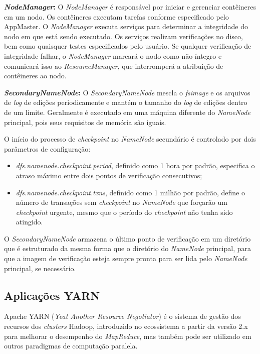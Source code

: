 \textbf{\emph{NodeManager}:} O \emph{NodeManager} é responsável por iniciar e gerenciar contêineres em um nodo. Os contêineres executam tarefas conforme especificado pelo AppMaster. O \emph{NodeManager} executa serviços para determinar a integridade do nodo em que está sendo executado. Os serviços realizam verificações no disco, bem como quaisquer testes especificados pelo usuário. Se qualquer verificação de integridade falhar, o \emph{NodeManager} marcará o nodo como não íntegro e comunicará isso ao \emph{ResourceManager}, que interromperá a atribuição de contêineres ao nodo.


    
\textbf{\emph{SecondaryNameNode}:} O \emph{SecondaryNameNode} mescla o \emph{fsimage} e os arquivos de \emph{log} de edições periodicamente e mantém o tamanho do \emph{log} de edições dentro de um limite. Geralmente é executado em uma máquina diferente do \emph{NameNode} principal, pois seus requisitos de memória são iguais.

O início do processo de \emph{checkpoint} no \emph{NameNode} secundário é controlado por dois parâmetros de configuração:

\begin{itemize}

\item \emph{dfs.namenode.checkpoint.period}, definido como 1 hora por padrão, especifica o atraso máximo entre dois pontos de verificação consecutivos;

\item \emph{dfs.namenode.checkpoint.txns}, definido como 1 milhão por padrão, define o número de transações sem \emph{checkpoint} no \emph{NameNode} que forçarão um \emph{checkpoint} urgente, mesmo que o período do \emph{checkpoint} não tenha sido atingido.

\end{itemize}
O \emph{SecondaryNameNode} armazena o último ponto de verificação em um diretório que é estruturado da mesma forma que o diretório do \emph{NameNode} principal, para que a imagem de verificação esteja sempre pronta para ser lida pelo \emph{NameNode} principal, se necessário.
    


\subsection{Aplicações YARN}

Apache YARN (\emph{Yeat Another Resource Negotiator}) é o sistema de gestão dos recursos dos \emph{clusters} Hadoop, introduzido no ecossistema a partir da versão 2.x para melhorar o desempenho do \emph{MapReduce}, mas também pode ser utilizado em outros paradigmas de computação paralela.

